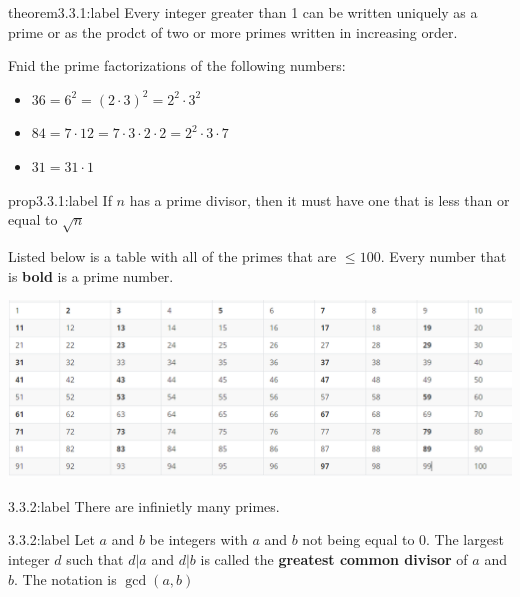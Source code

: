\begin{theorem}{theorem3.3.1:label}
    Every integer greater than 1 can be written uniquely as a prime or as the prodct of two or more primes written in increasing order.
\end{theorem}

\begin{problem}
    Fnid the prime factorizations of the following numbers:

    \begin{itemize}
        \item $36 = 6^2 = (2\cdot 3)^2 = 2^2\cdot 3^2$\\
        \item $84 = 7 \cdot 12 = 7 \cdot 3 \cdot 2 \cdot 2 = 2^2\cdot 3 \cdot 7$
        \item $31 = 31 \cdot 1$
    \end{itemize}
\end{problem}

\begin{proposition}{prop3.3.1:label}
    If $n$ has a prime divisor, then it must have one that is less than or equal to $\sqrt{n}$
\end{proposition}

Listed below is a table with all of the primes that are $\le 100$. Every number that is \textbf{bold} is a prime number.

\begin{center}
    \includegraphics[width=1.2\textwidth]{chapters/ch3/images/Primes_Chart.PNG}
\end{center}


\begin{theorem}{3.3.2:label}
    There are infinietly many primes.
\end{theorem}

\begin{definition}{3.3.2:label}
    Let $a$ and $b$ be integers with $a$ and $b$ not being equal to 0. The largest integer $d$ such that $d|a$ and $d|b$ is called the \textbf{greatest common divisor} of $a$ and $b$. The notation is $\gcd(a,b)$
\end{definition}

